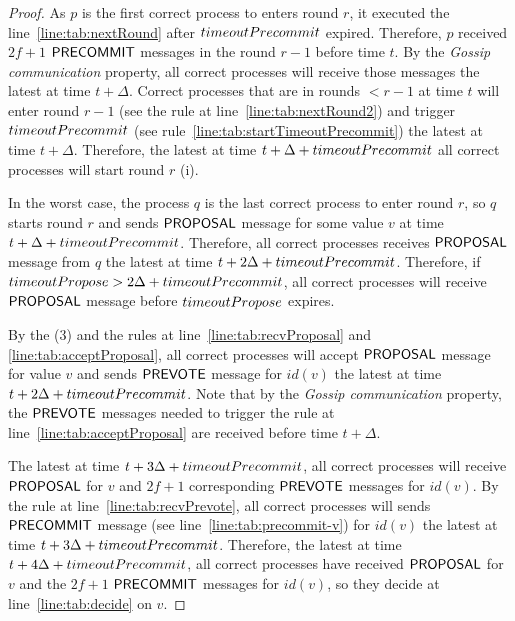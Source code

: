 \begin{proof}
As $p$ is the first correct process to enters round $r$, it executed the line~\ref{line:tab:nextRound} after $timeoutPrecommit$ expired. Therefore, $p$ received $2f+1$ $\mathsf{PRECOMMIT}$ messages in the round $r-1$ before time $t$. By the \emph{Gossip communication} property, all correct processes will receive those messages the latest at time $t + \Delta$. Correct processes that
are in rounds $< r-1$ at time $t$ will enter round $r-1$ (see the rule at line~\ref{line:tab:nextRound2}) and trigger $timeoutPrecommit$ (see rule~\ref{line:tab:startTimeoutPrecommit})
the latest at time $t+\Delta$. Therefore, the latest at time $t+\Delta+timeoutPrecommit$ all correct processes will start round $r$ (i).
 
In the worst case, the process $q$ is the last correct process to enter round $r$, so $q$ starts round $r$ and sends $\mathsf{PROPOSAL}$ message for some value $v$ at time $t + \Delta + timeoutPrecommit$. Therefore, all correct processes receives $\mathsf{PROPOSAL}$ message from $q$ the latest at time $t + 2\Delta + timeoutPrecommit$. Therefore, if $timeoutPropose > 2\Delta + timeoutPrecommit$, 
all correct processes will receive $\mathsf{PROPOSAL}$ message before $timeoutPropose$ expires. 

By the (3) and the rules at line~\ref{line:tab:recvProposal} and \ref{line:tab:acceptProposal}, all correct processes will accept $\mathsf{PROPOSAL}$ message for value $v$ and sends $\mathsf{PREVOTE}$ message for $id(v)$ the latest at time $t + 2\Delta + timeoutPrecommit$. 
Note that by the \emph{Gossip communication} property, the $\mathsf{PREVOTE}$ messages needed to trigger the rule at line~\ref{line:tab:acceptProposal} are received before time $t + \Delta$.  

The latest at time $t + 3\Delta + timeoutPrecommit$, all correct processes will receive $\mathsf{PROPOSAL}$ for $v$ and $2f+1$ corresponding $\mathsf{PREVOTE}$ messages for $id(v)$. By the rule at line~\ref{line:tab:recvPrevote}, all correct processes will sends $\mathsf{PRECOMMIT}$ message (see line~\ref{line:tab:precommit-v}) for $id(v)$ the latest at time $t + 3\Delta + timeoutPrecommit$. Therefore, the latest at time $t + 4\Delta + timeoutPrecommit$, all correct processes have received $\mathsf{PROPOSAL}$ for $v$ and the $2f+1$ $\mathsf{PRECOMMIT}$ messages for $id(v)$, so they decide at line~\ref{line:tab:decide} on $v$. 


\end{proof}
